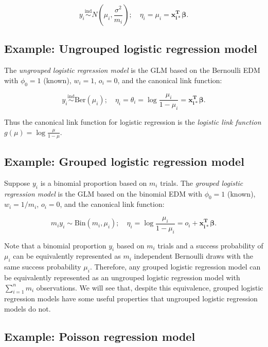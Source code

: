 \documentclass[
  11pt,
  letterpaper,
  oneside]{book}
\theoremstyle{plain}
\theoremstyle{plain}
\theoremstyle{definition}
\theoremstyle{definition}
\theoremstyle{plain}
\theoremstyle{remark}
\begin{document}
\[
y_i \overset{\text{ind}}\sim N(\mu_i, {\textstyle \frac{\sigma^2}{m_i}}); \quad \eta_i = \mu_i = \boldsymbol{x_{i*}^T} \boldsymbol{\beta}.
\]

\hypertarget{example-ungrouped-logistic-regression-model}{%
\subsection{Example: Ungrouped logistic regression
model}\label{example-ungrouped-logistic-regression-model}}

The \emph{ungrouped logistic regression model} is the GLM based on the
Bernoulli EDM with \(\phi_0 = 1\) (known), \(w_i = 1\), \(o_i = 0\), and
the canonical link function:

\[
y_i \overset{\text{ind}}\sim \text{Ber}(\mu_i); \quad \eta_i = \theta_i = \log\frac{\mu_i}{1-\mu_i} = \boldsymbol{x_{i*}^T} \boldsymbol{\beta}.
\]

Thus the canonical link function for logistic regression is the
\emph{logistic link function} \(g(\mu) = \log \frac{\mu}{1-\mu}\).

\hypertarget{example-grouped-logistic-regression-model}{%
\subsection{Example: Grouped logistic regression
model}\label{example-grouped-logistic-regression-model}}

Suppose \(y_i\) is a binomial proportion based on \(m_i\) trials. The
\emph{grouped logistic regression model} is the GLM based on the
binomial EDM with \(\phi_0 = 1\) (known), \(w_i = 1/m_i\), \(o_i = 0\),
and the canonical link function:

\[
m_i y_i \sim \text{Bin}(m_i, \mu_i); \quad \eta_i = \log \frac{\mu_i}{1-\mu_i} = o_i + \boldsymbol{x^T_{i*}}\boldsymbol{\beta}.
\]

Note that a binomial proportion \(y_i\) based on \(m_i\) trials and a
success probability of \(\mu_i\) can be equivalently represented as
\(m_i\) independent Bernoulli draws with the same success probability
\(\mu_i\). Therefore, any grouped logistic regression model can be
equivalently represented as an ungrouped logistic regression model with
\(\sum_{i = 1}^n m_i\) observations. We will see that, despite this
equivalence, grouped logistic regression models have some useful
properties that ungrouped logistic regression models do not.

\hypertarget{example-poisson-regression-model}{%
\subsection{Example: Poisson regression
model}\label{example-poisson-regression-model}}
\end{document}
